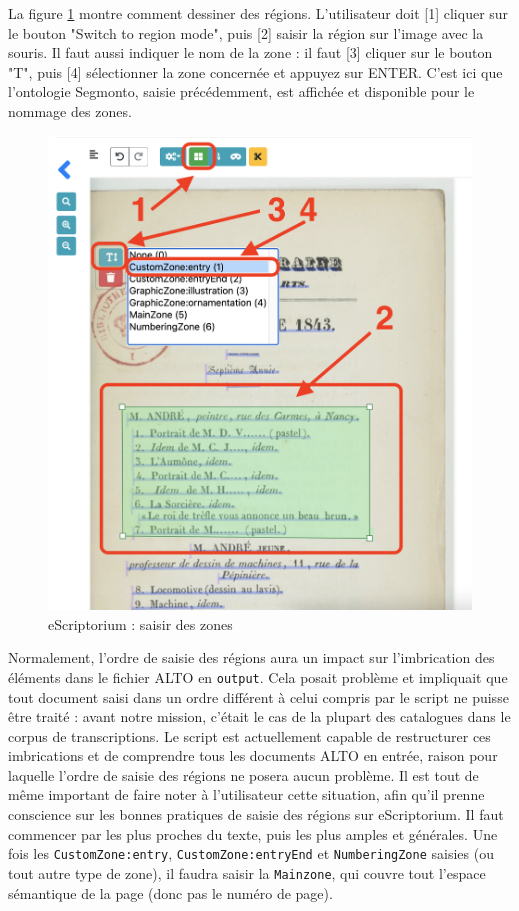 \documentclass[a4paper,12pt,twoside]{book}
\begin{document}
La figure \ref{regions} montre comment dessiner des régions. L'utilisateur doit [1] cliquer sur le bouton "Switch to region mode", puis [2] saisir la région sur l'image avec la souris. Il faut aussi indiquer le nom de la zone :  il faut [3] cliquer sur le bouton "T", puis [4] sélectionner la zone concernée et appuyez sur ENTER. C'est ici que l'ontologie Segmonto, saisie précédemment, est affichée et disponible pour le nommage des zones.
\begin{figure}[ht]
	\centering
	\includegraphics[scale=0.4]{regions_eScriptorium.png}		
	\caption{eScriptorium : saisir des zones}
	\label{regions}
\end{figure}

Normalement, l'ordre de saisie des régions aura un impact sur l'imbrication des éléments dans le fichier ALTO en \texttt{output}. Cela posait problème et impliquait que tout document saisi dans un ordre différent à celui compris par le script ne puisse être traité : avant notre mission, c'était le cas de la plupart des catalogues dans le corpus de transcriptions. \textsl{}Le script est actuellement capable de restructurer ces imbrications et de comprendre tous les documents ALTO en entrée, raison pour laquelle l'ordre de saisie des régions ne posera aucun problème. Il est tout de même important de faire noter à l'utilisateur cette situation, afin qu'il prenne conscience sur les bonnes pratiques de saisie des régions sur eScriptorium. Il faut commencer par les plus proches du texte, puis les plus amples et générales. Une fois les \texttt{CustomZone:entry}, \texttt{CustomZone:entryEnd} et \texttt{NumberingZone} saisies (ou tout autre type de zone), il faudra saisir la \texttt{Mainzone}, qui couvre tout l'espace sémantique de la page (donc pas le numéro de page).
\end{document}
